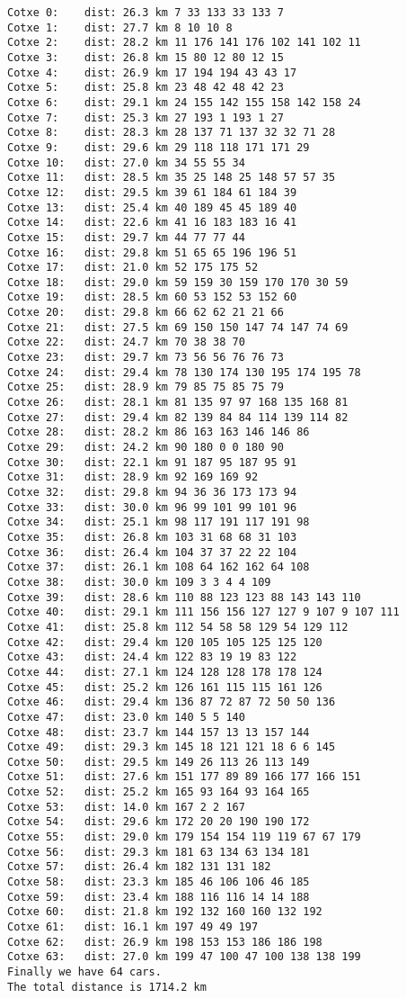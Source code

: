 \documentclass[12]{article}
\begin{document}
\begin{lstlisting}[frame=single]
Cotxe 0:	dist: 26.3 km 7 33 133 33 133 7
Cotxe 1:	dist: 27.7 km 8 10 10 8
Cotxe 2:	dist: 28.2 km 11 176 141 176 102 141 102 11
Cotxe 3:	dist: 26.8 km 15 80 12 80 12 15
Cotxe 4:	dist: 26.9 km 17 194 194 43 43 17
Cotxe 5:	dist: 25.8 km 23 48 42 48 42 23
Cotxe 6:	dist: 29.1 km 24 155 142 155 158 142 158 24
Cotxe 7:	dist: 25.3 km 27 193 1 193 1 27
Cotxe 8:	dist: 28.3 km 28 137 71 137 32 32 71 28
Cotxe 9:	dist: 29.6 km 29 118 118 171 171 29
Cotxe 10:	dist: 27.0 km 34 55 55 34
Cotxe 11:	dist: 28.5 km 35 25 148 25 148 57 57 35
Cotxe 12:	dist: 29.5 km 39 61 184 61 184 39
Cotxe 13:	dist: 25.4 km 40 189 45 45 189 40
Cotxe 14:	dist: 22.6 km 41 16 183 183 16 41
Cotxe 15:	dist: 29.7 km 44 77 77 44
Cotxe 16:	dist: 29.8 km 51 65 65 196 196 51
Cotxe 17:	dist: 21.0 km 52 175 175 52
Cotxe 18:	dist: 29.0 km 59 159 30 159 170 170 30 59
Cotxe 19:	dist: 28.5 km 60 53 152 53 152 60
Cotxe 20:	dist: 29.8 km 66 62 62 21 21 66
Cotxe 21:	dist: 27.5 km 69 150 150 147 74 147 74 69
Cotxe 22:	dist: 24.7 km 70 38 38 70
Cotxe 23:	dist: 29.7 km 73 56 56 76 76 73
Cotxe 24:	dist: 29.4 km 78 130 174 130 195 174 195 78
Cotxe 25:	dist: 28.9 km 79 85 75 85 75 79
Cotxe 26:	dist: 28.1 km 81 135 97 97 168 135 168 81
Cotxe 27:	dist: 29.4 km 82 139 84 84 114 139 114 82
Cotxe 28:	dist: 28.2 km 86 163 163 146 146 86
Cotxe 29:	dist: 24.2 km 90 180 0 0 180 90
Cotxe 30:	dist: 22.1 km 91 187 95 187 95 91
Cotxe 31:	dist: 28.9 km 92 169 169 92
Cotxe 32:	dist: 29.8 km 94 36 36 173 173 94
Cotxe 33:	dist: 30.0 km 96 99 101 99 101 96
Cotxe 34:	dist: 25.1 km 98 117 191 117 191 98
Cotxe 35:	dist: 26.8 km 103 31 68 68 31 103
Cotxe 36:	dist: 26.4 km 104 37 37 22 22 104
Cotxe 37:	dist: 26.1 km 108 64 162 162 64 108
Cotxe 38:	dist: 30.0 km 109 3 3 4 4 109
Cotxe 39:	dist: 28.6 km 110 88 123 123 88 143 143 110
Cotxe 40:	dist: 29.1 km 111 156 156 127 127 9 107 9 107 111
Cotxe 41:	dist: 25.8 km 112 54 58 58 129 54 129 112
Cotxe 42:	dist: 29.4 km 120 105 105 125 125 120
Cotxe 43:	dist: 24.4 km 122 83 19 19 83 122
Cotxe 44:	dist: 27.1 km 124 128 128 178 178 124
Cotxe 45:	dist: 25.2 km 126 161 115 115 161 126
Cotxe 46:	dist: 29.4 km 136 87 72 87 72 50 50 136
Cotxe 47:	dist: 23.0 km 140 5 5 140
Cotxe 48:	dist: 23.7 km 144 157 13 13 157 144
Cotxe 49:	dist: 29.3 km 145 18 121 121 18 6 6 145
Cotxe 50:	dist: 29.5 km 149 26 113 26 113 149
Cotxe 51:	dist: 27.6 km 151 177 89 89 166 177 166 151
Cotxe 52:	dist: 25.2 km 165 93 164 93 164 165
Cotxe 53:	dist: 14.0 km 167 2 2 167
Cotxe 54:	dist: 29.6 km 172 20 20 190 190 172
Cotxe 55:	dist: 29.0 km 179 154 154 119 119 67 67 179
Cotxe 56:	dist: 29.3 km 181 63 134 63 134 181
Cotxe 57:	dist: 26.4 km 182 131 131 182
Cotxe 58:	dist: 23.3 km 185 46 106 106 46 185
Cotxe 59:	dist: 23.4 km 188 116 116 14 14 188
Cotxe 60:	dist: 21.8 km 192 132 160 160 132 192
Cotxe 61:	dist: 16.1 km 197 49 49 197
Cotxe 62:	dist: 26.9 km 198 153 153 186 186 198
Cotxe 63:	dist: 27.0 km 199 47 100 47 100 138 138 199
Finally we have 64 cars.
The total distance is 1714.2 km

\end{lstlisting}
\end{document}
